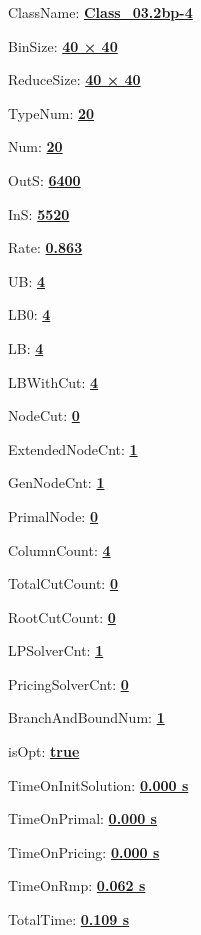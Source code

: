 \documentclass[11pt]{article}
\begin{document}
\pagestyle{empty}


ClassName: \underline{\textbf{Class_03.2bp-4}}
\par
BinSize: \underline{\textbf{40 × 40}}
\par
ReduceSize: \underline{\textbf{40 × 40}}
\par
TypeNum: \underline{\textbf{20}}
\par
Num: \underline{\textbf{20}}
\par
OutS: \underline{\textbf{6400}}
\par
InS: \underline{\textbf{5520}}
\par
Rate: \underline{\textbf{0.863}}
\par
UB: \underline{\textbf{4}}
\par
LB0: \underline{\textbf{4}}
\par
LB: \underline{\textbf{4}}
\par
LBWithCut: \underline{\textbf{4}}
\par
NodeCut: \underline{\textbf{0}}
\par
ExtendedNodeCnt: \underline{\textbf{1}}
\par
GenNodeCnt: \underline{\textbf{1}}
\par
PrimalNode: \underline{\textbf{0}}
\par
ColumnCount: \underline{\textbf{4}}
\par
TotalCutCount: \underline{\textbf{0}}
\par
RootCutCount: \underline{\textbf{0}}
\par
LPSolverCnt: \underline{\textbf{1}}
\par
PricingSolverCnt: \underline{\textbf{0}}
\par
BranchAndBoundNum: \underline{\textbf{1}}
\par
isOpt: \underline{\textbf{true}}
\par
TimeOnInitSolution: \underline{\textbf{0.000 s}}
\par
TimeOnPrimal: \underline{\textbf{0.000 s}}
\par
TimeOnPricing: \underline{\textbf{0.000 s}}
\par
TimeOnRmp: \underline{\textbf{0.062 s}}
\par
TotalTime: \underline{\textbf{0.109 s}}
\par
\newpage


\end{document}
